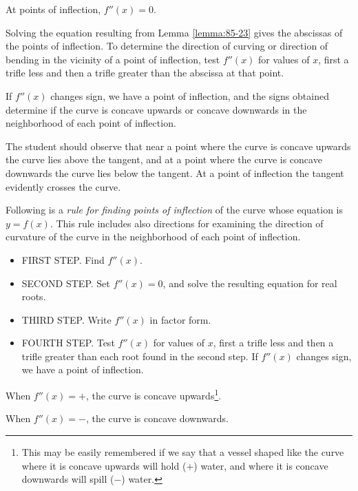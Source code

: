 \begin{lemma}
\label{lemma:85-23}
{\rm At points of inflection, $f''(x) = 0$}. 
\end{lemma}

Solving the equation resulting from Lemma \ref{lemma:85-23}
gives the abscissas of the points of inflection. To determine the 
direction of curving or direction of bending in the vicinity of a 
point of inflection, test $f''(x)$ for values of $x$, first a trifle 
less and then a trifle greater than the abscissa at that point.

If $f''(x)$ changes sign, we have a point of inflection, and the 
signs obtained determine if the curve is concave upwards or concave 
downwards in the neighborhood of each point of inflection.

The student should observe that near a point where the curve 
is concave upwards the curve lies above the tangent, and at a 
point where the curve is concave downwards the curve lies below the 
tangent. At a point of inflection the tangent evidently crosses the curve.

Following is a {\it rule for finding points of inflection} of 
the curve whose equation is $y = f(x)$. This rule includes also 
directions for examining the direction of curvature of the curve 
in the neighborhood of each point of inflection.

\begin{itemize}
\item
FIRST STEP. Find $f''(x)$.

\item
SECOND STEP. Set $f''(x) = 0$, and solve the resulting equation for real roots.

\item
THIRD STEP. Write $f''(x)$ in factor form.

\item
FOURTH STEP. Test $f''(x)$ for values of $x$, first a trifle less and 
then a trifle greater than each root found in the second step. 
If $f''(x)$ changes sign, we have a point of inflection.
\end{itemize}

When $f''(x) = +$, the curve is concave upwards\footnote{This may be 
easily remembered if we say that a vessel shaped like the curve 
where it is concave upwards will hold ($+$) water, and where it is 
concave downwards will spill ($-$) water.}.

When $f''(x) = -$, the curve is concave downwards.

